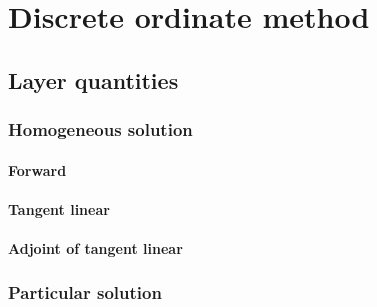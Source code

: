 %
\section{Discrete ordinate method}
\label{sec:dom}


\subsection{Layer quantities}
\label{sec:dom-layer_quantities}

\subsubsection{Homogeneous solution}
\label{sec:dom-layer_quantities-homogeneous_solution}


\paragraph{Forward}
\label{sec:dom-layer_quantities-homogeneous_solution-forward}


%
\paragraph{Tangent linear}
\label{sec:dom-layer_quantities-homogeneous_solution-tangent_linear}


%
\paragraph{Adjoint of tangent linear}
\label{sec:dom-layer_quantities-homogeneous_solution-adjoint_of_tangent_linear}


%
\subsubsection{Particular solution}
\label{sec:dom-layer_quantities-particular_solution}


